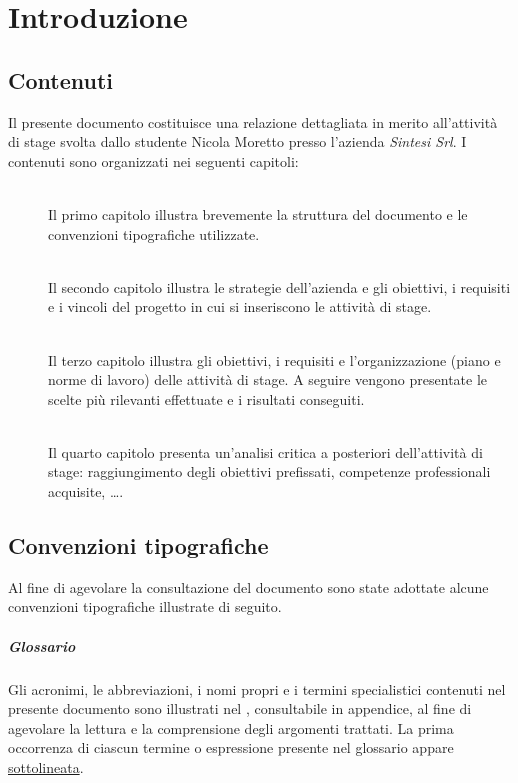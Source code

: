 \chapter{Introduzione}
\label{ch:tesi:intro}
\section{Contenuti}
\label{ch:tesi:intro:contenuti}
Il presente documento costituisce una relazione dettagliata in merito all'attività di stage svolta dallo studente Nicola Moretto presso l'azienda \textit{Sintesi Srl}. I contenuti sono organizzati nei seguenti capitoli:
\begin{description}
  \item[] \hfill \\
  Il primo capitolo illustra brevemente la struttura del documento e le convenzioni tipografiche utilizzate.
  \item[] \hfill \\
  Il secondo capitolo illustra le strategie dell'azienda e gli obiettivi, i requisiti e i vincoli del progetto in cui si inseriscono le attività di stage.
  \item[] \hfill \\ 
	Il terzo capitolo illustra gli obiettivi, i requisiti e l'organizzazione (piano e norme di lavoro) delle attività di stage. A seguire vengono presentate le scelte più rilevanti effettuate e i risultati conseguiti.
  \item[] \hfill \\
	Il quarto capitolo presenta un'analisi critica a posteriori dell'attività di stage: raggiungimento degli obiettivi prefissati, competenze professionali acquisite, \ldots.
\end{description}

\section{Convenzioni tipografiche}
\label{ch:tesi:intro:convenzioni}
Al fine di agevolare la consultazione del documento sono state adottate alcune convenzioni tipografiche illustrate di seguito.

\paragraph{Glossario} Gli acronimi, le abbreviazioni, i nomi propri e i termini specialistici contenuti nel presente documento sono illustrati nel \textit{}, consultabile in appendice, al fine di agevolare la lettura e la comprensione degli argomenti trattati. La prima occorrenza di ciascun termine o espressione presente nel glossario appare \underline{sottolineata}.

